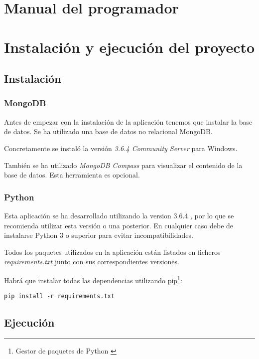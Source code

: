 \section{Manual del programador}

\section{Instalación y ejecución del proyecto}

\subsection{Instalación}

\subsubsection{MongoDB}

Antes de empezar con la instalación de la aplicación tenemos que instalar la base de datos.
Se ha utilizado una base de datos no relacional MongoDB.

Concretamente se instaló la versión \textit{3.6.4 Community Server} \cite{misc:mongodb} para Windows.

También se ha utilizado \textit{MongoDB Compass} \cite{misc:mongodb} para visualizar el contenido de la base de datos. Esta herramienta es opcional.

\subsubsection{Python}

Esta aplicación se ha desarrollado utilizando la version 3.6.4 \cite{misc:python3}, por lo que se recomienda utilizar esta versión o una posterior. En cualquier caso debe de instalarse Python 3 o superior para evitar incompatibilidades.

Todos los paquetes utilizados en la aplicación están listados en ficheros \textit{requirements.txt} junto con sus correspondientes versiones.

Habrá que instalar todas las dependencias utilizando pip\footnote{Gestor de paquetes de Python \cite{wiki:pip}}:

\begin{lstlisting}
pip install -r requirements.txt
\end{lstlisting}

\subsection{Ejecución}

